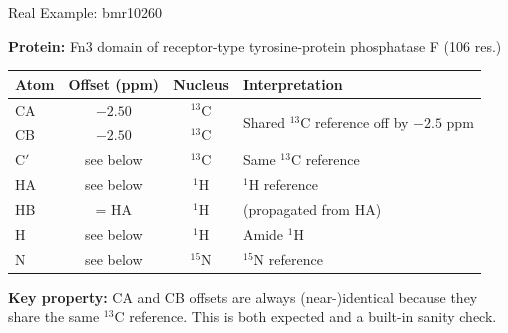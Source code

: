 \documentclass[aspectratio=169,11pt]{beamer}
\begin{document}
\begin{frame}[shrink=10]{Real Example: bmr10260}

\textbf{Protein:} Fn3 domain of receptor-type tyrosine-protein phosphatase F (106 res.)

\medskip
\begin{center}
\begin{tabular}{lccl}
\toprule
\textbf{Atom} & \textbf{Offset (ppm)} & \textbf{Nucleus} & \textbf{Interpretation} \\
\midrule
CA & $-2.50$ & ${}^{13}$C & \multirow{2}{*}{Shared ${}^{13}$C reference off by $-2.5$ ppm} \\
CB & $-2.50$ & ${}^{13}$C & \\
C$'$ & see below & ${}^{13}$C & Same ${}^{13}$C reference \\
\midrule
HA & see below & ${}^{1}$H & ${}^{1}$H reference \\
HB & = HA & ${}^{1}$H & (propagated from HA) \\
\midrule
H  & see below & ${}^{1}$H & Amide ${}^{1}$H \\
N  & see below & ${}^{15}$N & ${}^{15}$N reference \\
\bottomrule
\end{tabular}
\end{center}

\bigskip
\textbf{Key property:} CA and CB offsets are always (near-)identical because they share the same ${}^{13}$C reference.
This is both expected and a built-in sanity check.
\end{frame}
\end{document}
